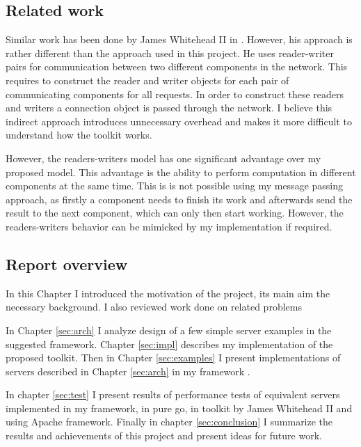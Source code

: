 \documentclass[12pt,a4paper]{article}
\begin{document}

\subsection{Related work}
Similar work has been done by James Whitehead II in \cite{whitehead}.
However, his approach is rather different than the approach used 
in this project. He uses reader-writer pairs for communication between
two different components in the network. This requires to construct the
reader and writer objects for each pair of communicating components
for all requests.
In order to construct these readers and writers a connection object is 
passed through the network.
I believe this indirect approach introduces unnecessary overhead and 
makes it more difficult to understand how the toolkit works.

However, the readers-writers model has one significant advantage over
my proposed model. This advantage is the ability to
perform computation in different components at the same time. This is
is not possible using my message passing approach, as firstly a 
component needs to finish its work and afterwards send the result to the next
component, which can only then start working.
However, the readers-writers behavior can be mimicked by my implementation 
if required.

\subsection{Report overview}
In this Chapter I introduced the motivation of the project, its main
aim the necessary background. I also reviewed work done on related 
problems

In Chapter \ref{sec:arch} I analyze design of a few simple server examples 
in the suggested framework. Chapter \ref{sec:impl} describes my implementation
of the proposed toolkit. Then in Chapter \ref{sec:examples} I present
implementations of servers described in Chapter \ref{sec:arch} in my framework .

In chapter \ref{sec:test} I present results of performance tests of equivalent 
servers implemented in my framework, in pure go, in toolkit by James Whitehead II
\cite{whitehead} and using Apache framework. Finally in chapter 
\ref{sec:conclusion} I summarize the results and achievements of this 
project and present ideas for future work.

\end{document}

